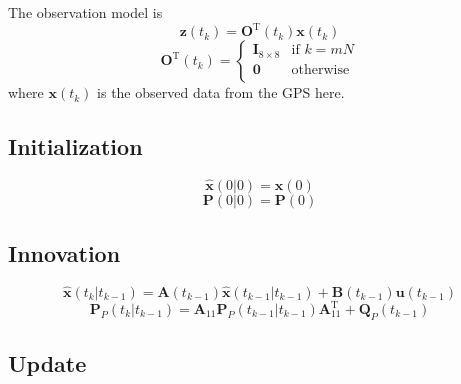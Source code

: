 \documentclass[a4paper]{report}
\numberwithin{equation}{chapter}
\newcommand{\mat}[1]{\boldsymbol{#1}}
\begin{document}
\bigskip

The observation model is
\begin{equation}
\mat{z} \left( t_k \right) = \mat{O}^{\mathrm{T}} \left( t_k \right) \mat{x} \left( t_k \right)
\end{equation}
\begin{equation}
\mat{O}^{\mathrm{T}} \left( t_k \right) =
\begin{cases}
\mat{I}_{8 \times 8} & \text{if $k = mN$}\\
\mat{0} & \text{otherwise}\\
\end{cases}
\end{equation}
where $\mat{x} \left( t_k \right)$ is the observed data from the GPS here.

\subsection[Initialization]{Initialization}

\begin{equation}
\hat{\mat{x}} \left( 0 | 0 \right) = \mat{x} \left( 0 \right)
\end{equation}
\begin{equation}
\mat{P} \left( 0 | 0 \right) = \mat{P} \left( 0 \right)
\end{equation}

\subsection[Innovation]{Innovation}

\begin{equation}
\hat{\mat{x}} \left( t_k | t_{k - 1} \right) = \mat{A} \left( t_{k - 1} \right) \hat{\mat{x}} \left( t_{k - 1} | t_{k - 1} \right) + \mat{B} \left( t_{k - 1} \right) \mat{u} \left( t_{k - 1} \right)
\end{equation}
\begin{equation}
\mat{P}_P \left( t_k | t_{k - 1} \right) = \mat{A}_{11} \mat{P}_P \left( t_{k - 1} | t_{k - 1} \right) \mat{A}^{\mathrm{T}}_{11} + \mat{Q}_P \left( t_{k - 1} \right)
\end{equation}

\subsection[Update]{Update}
\end{document}
